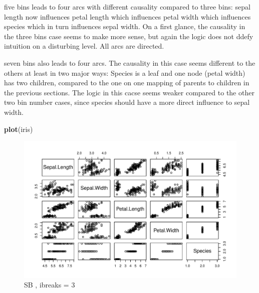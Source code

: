 \documentclass[]{article}
\newenvironment{Shaded}{\begin{snugshade}}{\end{snugshade}}
\newcommand{\KeywordTok}[1]{\textcolor[rgb]{0.13,0.29,0.53}{\textbf{{#1}}}}
\newcommand{\NormalTok}[1]{{#1}}
\begin{document}
five bins leads to four arcs with different causality compared to three
bins: sepal length now influences petal length which influences petal
width which influences species which in turn influences sepal width. On
a first glance, the causality in the three bins case seems to make more
sense, but again the logic does not ddefy intuition on a disturbing
level. All arcs are directed.

seven bins also leads to four arcs. The causality in this case seems
different to the others at least in two major ways: Species is a leaf
and one node (petal width) has two children, compared to the one on one
mapping of parents to children in the previous sections. The logic in
this cacse seems weaker compared to the other two bin number cases,
since species should have a more direct influence to sepal width.

\begin{Shaded}
\begin{Highlighting}[]
\KeywordTok{plot}\NormalTok{(iris)}
\end{Highlighting}
\end{Shaded}

\begin{figure}[htbp]
\centering
\includegraphics{BN_Ass2_files/figure-latex/unnamed-chunk-2-1.pdf}
\caption{SB , ibreaks = 3}
\end{figure}
\end{document}
